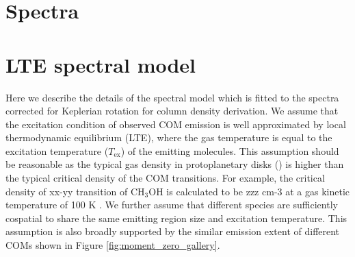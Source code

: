 \documentclass[linenumbers, twocolumn, twocolappendix, astrosymb, times]{aastex631}
\newcommand{\methanol}{CH$_3$OH\xspace}
\begin{document}





\section{Spectra}\label{appendix:spectra}
\begin{figure*}
\end{figure*}

\begin{figure*}
\end{figure*}

\begin{figure*}
\end{figure*}

\section{LTE spectral model}\label{appendix:spectral_model}
Here we describe the details of the spectral model which is fitted to the spectra corrected for Keplerian rotation for column density derivation. We assume that the excitation condition of observed COM emission is well approximated by local thermodynamic equilibrium (LTE), where the gas temperature is equal to the excitation temperature ($T_\mathrm{ex}$) of the emitting molecules. This assumption should be reasonable as the typical gas density in protoplanetary disks () is higher than the typical critical density of the COM transitions. For example, the critical density of xx-yy transition of \methanol is calculated to be zzz cm-3 at a gas kinetic temperature of 100 K \citep[ref][]{}. We further assume that different species are sufficiently cospatial to share the same emitting region size and excitation temperature. This assumption is also broadly supported by the similar emission extent of different COMs shown in Figure \ref{fig:moment_zero_gallery}. 
\end{document}

